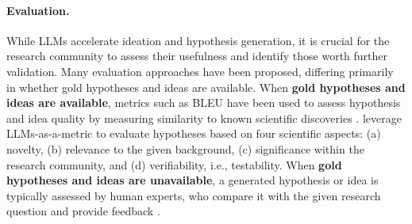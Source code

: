 \paragraph{Evaluation.} 
While LLMs accelerate ideation and hypothesis generation,
it is crucial for the research community to assess their usefulness and identify those worth further validation. Many evaluation approaches have been proposed, differing primarily in whether gold hypotheses and ideas are available. 
When \textbf{gold hypotheses and ideas are available}, 
    metrics such as BLEU \cite{papineni2002bleu} 
    have been used to assess hypothesis and idea quality by measuring similarity to known scientific discoveries \cite{yang2024moose, chai2024exploring}. %
    \citet{qi2024large} leverage
    LLMs-as-a-metric to evaluate hypotheses based on four scientific aspects: (a) novelty, (b) relevance to the given background, (c) significance within the research community, and (d) verifiability, i.e., testability. 
    When \textbf{gold hypotheses and ideas are unavailable}, a generated hypothesis or idea is typically assessed by human experts, who compare it with the given research question and provide feedback \cite{yang2023large}. 
